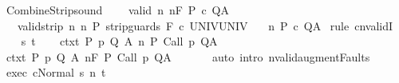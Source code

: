\begin{isabellebody}
%
\endisadelimproof
\isanewline
{}\isamarkupfalse%
\ CombineStrip{\isacharunderscore}sound{\isacharcolon}\ \isanewline
\ \ \ valid{\isacharcolon}\ {\isachardoublequoteopen}{\isasymforall}n{\isachardot}\ {\isasymGamma}{\isacharcomma}{\isasymTheta}{\isasymTurnstile}n{\isacharcolon}\isactrlbsub {\isacharslash}F\isactrlesub \ P\ c\ Q{\isacharcomma}A{\isachardoublequoteclose}\isanewline
\ \ \ valid{\isacharunderscore}strip{\isacharcolon}\ {\isachardoublequoteopen}{\isasymforall}n{\isachardot}\ {\isasymGamma}{\isacharcomma}{\isasymTheta}{\isasymTurnstile}n{\isacharcolon}\isactrlbsub {\isacharslash}{\isacharbraceleft}{\isacharbraceright}\isactrlesub \ P\ {\isacharparenleft}strip{\isacharunderscore}guards\ {\isacharparenleft}{\isacharminus}F{\isacharparenright}\ c{\isacharparenright}\ UNIV{\isacharcomma}UNIV{\isachardoublequoteclose}\isanewline
\ \ \ {\isachardoublequoteopen}{\isasymGamma}{\isacharcomma}{\isasymTheta}{\isasymTurnstile}n{\isacharcolon}\isactrlbsub {\isacharslash}{\isacharbraceleft}{\isacharbraceright}\isactrlesub \ P\ c\ Q{\isacharcomma}A{\isachardoublequoteclose}\isanewline
%
\isadelimproof
%
\endisadelimproof
%
\isatagproof
{}\isamarkupfalse%
\ {\isacharparenleft}rule\ cnvalidI{\isacharparenright}\isanewline
\ \ \isamarkupfalse%
\ s\ t\isanewline
\ \ \isamarkupfalse%
\ ctxt{\isacharcolon}\ {\isachardoublequoteopen}{\isasymforall}{\isacharparenleft}P{\isacharcomma}\ p{\isacharcomma}\ Q{\isacharcomma}\ A{\isacharparenright}{\isasymin}{\isasymTheta}{\isachardot}\ {\isasymGamma}{\isasymTurnstile}n{\isacharcolon}\isactrlbsub {\isacharslash}{\isacharbraceleft}{\isacharbraceright}\isactrlesub \ P\ {\isacharparenleft}Call\ p{\isacharparenright}\ Q{\isacharcomma}A{\isachardoublequoteclose}\ \isanewline
\ \ \isamarkupfalse%
\ ctxt{\isacharprime}{\isacharcolon}\ {\isachardoublequoteopen}{\isasymforall}{\isacharparenleft}P{\isacharcomma}\ p{\isacharcomma}\ Q{\isacharcomma}\ A{\isacharparenright}{\isasymin}{\isasymTheta}{\isachardot}\ {\isasymGamma}{\isasymTurnstile}n{\isacharcolon}\isactrlbsub {\isacharslash}F\isactrlesub \ P\ {\isacharparenleft}Call\ p{\isacharparenright}\ Q{\isacharcomma}A{\isachardoublequoteclose}\ \isanewline
\ \ \ \ \isamarkupfalse%
\ {\isacharparenleft}auto\ intro{\isacharcolon}\ nvalid{\isacharunderscore}augment{\isacharunderscore}Faults{\isacharparenright}\isanewline
\ \ \isamarkupfalse%
\ exec{\isacharcolon}\ {\isachardoublequoteopen}{\isasymGamma}{\isasymturnstile}{\isasymlangle}c{\isacharcomma}Normal\ s{\isasymrangle}\ {\isacharequal}n{\isasymRightarrow}\ t{\isachardoublequoteclose}\ \isanewline

\end{isabellebody}
